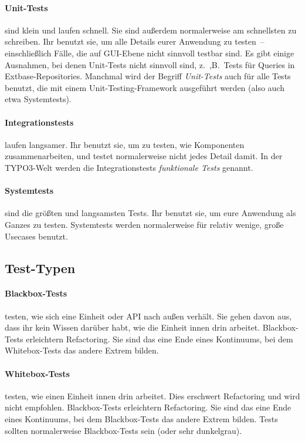 \documentclass[a4paper,10pt,headsepline]{scrartcl}
\begin{document}
\paragraph{Unit-Tests} sind klein und laufen schnell. Sie sind außerdem normalerweise am schnellsten zu schreiben. Ihr benutzt sie, um alle Details eurer Anwendung zu testen~-- einschließlich Fälle, die auf GUI-Ebene nicht sinnvoll testbar sind. Es gibt einige Ausnahmen, bei denen Unit-Tests nicht sinnvoll sind, z.~,B.~Tests für Queries in Extbase-Repositories. Manchmal wird der Begriff \emph{Unit-Tests} auch für alle Tests benutzt, die mit einem Unit-Testing-Framework ausgeführt werden (also auch etwa Systemtests).

\paragraph{Integrationstests} laufen langsamer. Ihr benutzt sie, um zu testen, wie Komponenten zusammenarbeiten, und testet normalerweise nicht jedes Detail damit. In der TYPO3-Welt werden die Integrationstests \emph{funktionale Tests} genannt.

\paragraph{Systemtests} sind die größten und langsamsten Tests. Ihr benutzt sie, um eure Anwendung als Ganzes zu testen. Systemtests werden normalerweise für relativ wenige, große Usecases benutzt.


\subsection{Test-Typen}

\paragraph{Blackbox-Tests} testen, wie sich eine Einheit oder API nach außen verhält. Sie gehen davon aus, dass ihr kein Wissen darüber habt, wie die Einheit innen drin arbeitet. Blackbox-Tests erleichtern Refactoring. Sie sind das eine Ende eines Kontinuums, bei dem Whitebox-Tests das andere Extrem bilden.

\paragraph{Whitebox-Tests} testen, wie einen Einheit innen drin arbeitet. Dies erschwert Refactoring und wird nicht empfohlen. Blackbox-Tests erleichtern Refactoring. Sie sind das eine Ende eines Kontinuums, bei dem Blackbox-Tests das andere Extrem bilden. Tests sollten normalerweise Blackbox-Tests sein (oder sehr dunkelgrau).
\end{document}
